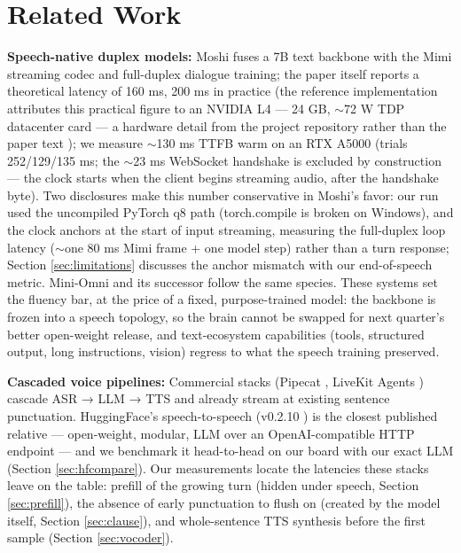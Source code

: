 \documentclass{article}
\begin{document}
\section{Related Work}

\textbf{Speech-native duplex models:} Moshi \citep{defossez2024moshi} fuses a 7B text backbone with the Mimi streaming codec and full-duplex dialogue training; the paper itself reports a theoretical latency of 160 ms, 200 ms in practice \citep{defossez2024moshi} (the reference implementation attributes this practical figure to an NVIDIA L4 — 24 GB, $\sim$72 W TDP datacenter card — a hardware detail from the project repository rather than the paper text \citep{kyutai2024moshirepo,nvidial4}); we measure $\sim$130 ms TTFB warm on an RTX A5000 (trials 252/129/135 ms; the $\sim$23 ms WebSocket handshake is excluded by construction — the clock starts when the client begins streaming audio, after the handshake byte). Two disclosures make this number conservative in Moshi's favor: our run used the uncompiled PyTorch q8 path (torch.compile is broken on Windows), and the clock anchors at the start of input streaming, measuring the full-duplex loop latency ($\sim$one 80 ms Mimi frame + one model step) rather than a turn response; Section \ref{sec:limitations} discusses the anchor mismatch with our end-of-speech metric. Mini-Omni and its successor \citep{xie2024miniomni,xie2024miniomni2} follow the same species. These systems set the fluency bar, at the price of a fixed, purpose-trained model: the backbone is frozen into a speech topology, so the brain cannot be swapped for next quarter's better open-weight release, and text-ecosystem capabilities (tools, structured output, long instructions, vision) regress to what the speech training preserved.

\textbf{Cascaded voice pipelines:} Commercial stacks (Pipecat \citep{pipecat}, LiveKit Agents \citep{livekitagents}) cascade ASR → LLM → TTS and already stream at existing sentence punctuation. HuggingFace's speech-to-speech (v0.2.10 \citep{hfspeech2speech}) is the closest published relative — open-weight, modular, LLM over an OpenAI-compatible HTTP endpoint — and we benchmark it head-to-head on our board with our exact LLM (Section \ref{sec:hfcompare}). Our measurements locate the latencies these stacks leave on the table: prefill of the growing turn (hidden under speech, Section \ref{sec:prefill}), the absence of early punctuation to flush on (created by the model itself, Section \ref{sec:clause}), and whole-sentence TTS synthesis before the first sample (Section \ref{sec:vocoder}).
\end{document}

